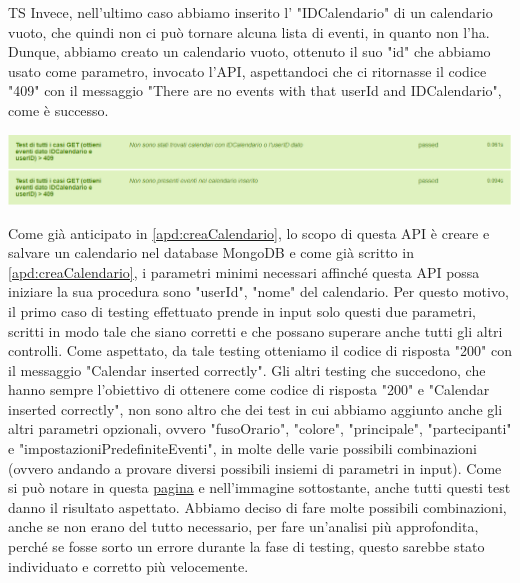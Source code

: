 \begin{listaPersonale}{TS}
                Invece, nell'ultimo caso abbiamo inserito l' "IDCalendario" di un calendario vuoto, che quindi non ci può tornare alcuna lista di eventi, in quanto non l'ha. Dunque, abbiamo creato un calendario vuoto, ottenuto il suo "id" che abbiamo usato come parametro, invocato l'API, aspettandoci che ci ritornasse il codice "409" con il messaggio "There are no events with that userId and IDCalendario", come è successo.
                \begin{center}
                        \includegraphics[width=1\textwidth, height=0.09\textheight]{img/png/tests/EventoGet/409_getEventi.png}
                \end{center}
                Come già anticipato in \ref{apd:creaCalendario}, lo scopo di questa API è creare e salvare un calendario nel database MongoDB e come già scritto in \ref{apd:creaCalendario}, i parametri minimi necessari affinché questa API possa iniziare la sua procedura sono "userId", "nome" del calendario. Per questo motivo, il primo caso di testing effettuato prende in input solo questi due parametri, scritti in modo tale che siano corretti e che possano superare anche tutti gli altri controlli. Come aspettato, da tale testing otteniamo il codice di risposta "200" con il messaggio "Calendar inserted correctly". Gli altri testing che succedono, che hanno sempre l'obiettivo di ottenere come codice di risposta "200" e "Calendar inserted correctly", non sono altro che dei test in cui abbiamo aggiunto anche gli altri parametri opzionali, ovvero "fusoOrario", "colore", "principale", "partecipanti" e "impostazioniPredefiniteEventi", in molte delle varie possibili combinazioni (ovvero andando a provare diversi possibili insiemi di parametri in input). Come si può notare in questa \href{https://plan-it.it/test-report.html} {pagina} e nell'immagine sottostante, anche tutti questi test danno il risultato aspettato. Abbiamo deciso di fare molte possibili combinazioni, anche se non erano del tutto necessario, per fare un'analisi più approfondita, perché se fosse sorto un errore durante la fase di testing, questo sarebbe stato individuato e corretto più velocemente.

\end{listaPersonale}
